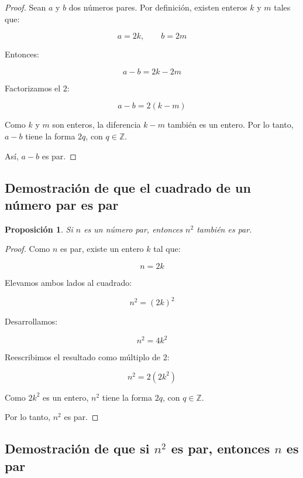 \documentclass[12pt,final]{report}
\theoremstyle{plain}
\newtheorem{proposition}[theorem]{Proposición}
\theoremstyle{definition}
\begin{document}
\begin{proof}

Sean $a$ y $b$ dos números pares. Por definición, existen enteros $k$ y $m$ tales que:

\[
a = 2k, \qquad b = 2m
\]

Entonces:

\[
a-b = 2k - 2m
\]

Factorizamos el $2$:

\[
a-b = 2(k-m)
\]

Como $k$ y $m$ son enteros, la diferencia $k-m$ también es un entero. Por lo tanto, $a-b$ tiene la forma $2q$, con $q \in \mathbb{Z}$.

Así, $a-b$ es par.

\end{proof}

\newpage

\subsection{Demostración de que el cuadrado de un número par es par}

\begin{proposition}
Si $n$ es un número par, entonces $n^2$ también es par.
\end{proposition}

\begin{proof}

Como $n$ es par, existe un entero $k$ tal que:

\[
n = 2k
\]

Elevamos ambos lados al cuadrado:

\[
n^2 = (2k)^2
\]

Desarrollamos:

\[
n^2 = 4k^2
\]

Reescribimos el resultado como múltiplo de $2$:

\[
n^2 = 2(2k^2)
\]

Como $2k^2$ es un entero, $n^2$ tiene la forma $2q$, con $q \in \mathbb{Z}$.

Por lo tanto, $n^2$ es par.

\end{proof}

\newpage

\subsection{Demostración de que si $n^2$ es par, entonces $n$ es par}
\end{document}
